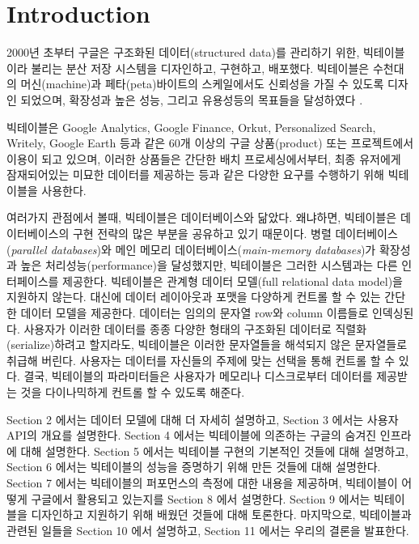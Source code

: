 \documentclass[twocolumn]{article}
\begin{document}
\section{Introduction}

2000년 초부터 구글은 구조화된 데이터(structured data)를 관리하기 위한, 빅테이블이라 불리는 분산 저장 시스템을 디자인하고, 구현하고, 배포했다.
빅테이블은 수천대의 머신(machine)과 페타(peta)바이트의 스케일에서도 신뢰성을 가질 수 있도록 디자인 되었으며, 확장성과 높은 성능, 그리고 유용성등의 목표들을 달성하였다 \cite{Chang:2008:BDS}.

빅테이블은 Google Analytics, Google Finance, Orkut, Personalized Search, Writely, Google Earth 등과 같은 60개 이상의 구글 상품(product) 또는 프로젝트에서 이용이 되고 있으며, 이러한 상품들은 간단한 배치 프로세싱에서부터, 최종 유저에게 잠재되어있는 미묘한 데이터를 제공하는 등과 같은 다양한 요구를 수행하기 위해 빅테이블을 사용한다.
 
 여러가지 관점에서 볼때,  빅테이블은 데이터베이스와 닮았다. 왜냐하면, 빅테이블은 데이터베이스의 구현 전략의 많은 부분을 공유하고 있기 때문이다.
 병렬 데이터베이스(\textit{parallel databases})와 메인 메모리 데이터베이스(\textit{main-memory databases})가 확장성과 높은 처리성능(performance)을 달성했지만, 빅테이블은 그러한 시스템과는 다른 인터페이스를 제공한다. 빅테이블은 관계형 데이터 모델(full relational data model)을 지원하지 않는다. 대신에 데이터 레이아웃과 포맷을 다양하게 컨트롤 할 수 있는 간단한 데이터 모델을 제공한다.
데이터는 임의의 문자열 row와 column 이름들로 인덱싱된다. 사용자가 이러한 데이터를 종종 다양한 형태의 구조화된 데이터로 직렬화(serialize)하려고 할지라도, 빅테이블은 이러한 문자열들을 해석되지 않은 문자열들로 취급해 버린다. 사용자는 데이터를 자신들의 주제에 맞는 선택을 통해 컨트롤 할 수 있다. 결국, 빅테이블의 파라미터들은 사용자가 메모리나 디스크로부터 데이터를 제공받는 것을 다이나믹하게 컨트롤 할 수 있도록 해준다.
 
 Section 2 에서는 데이터 모델에 대해 더 자세히 설명하고, Section 3 에서는 사용자 API의 개요를 설명한다. Section 4 에서는 빅테이블에 의존하는 구글의 숨겨진 인프라에 대해 설명한다. Section 5 에서는 빅테이블 구현의 기본적인 것들에 대해 설명하고, Section 6 에서는 빅테이블의 성능을 증명하기 위해 만든 것들에 대해 설명한다. Section 7 에서는 빅테이블의 퍼포먼스의 측정에 대한 내용을 제공하며, 빅테이블이 어떻게 구글에서 활용되고 있는지를 Section 8 에서 설명한다. Section 9 에서는 빅테이블을 디자인하고 지원하기 위해 배웠던 것들에 대해 토론한다. 마지막으로, 빅테이블과 관련된 일들을 Section 10 에서 설명하고, Section 11 에서는 우리의 결론을 발표한다.
\end{document}

